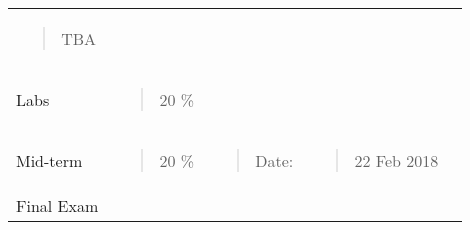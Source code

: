 \begin{longtable}[]{@{}lllll@{}}
\begin{minipage}[t]{0.19\columnwidth}
\begin{quote}
TBA
\end{quote}\strut
\end{minipage} & \begin{minipage}[t]{0.19\columnwidth}\raggedright\strut
\strut
\end{minipage}\tabularnewline
\begin{minipage}[t]{0.19\columnwidth}\raggedright\strut
Labs\strut
\end{minipage} & \begin{minipage}[t]{0.19\columnwidth}\raggedright\strut
\begin{quote}
20 \%
\end{quote}\strut
\end{minipage} & \begin{minipage}[t]{0.19\columnwidth}\raggedright\strut
\strut
\end{minipage} & \begin{minipage}[t]{0.19\columnwidth}\raggedright\strut
\strut
\end{minipage} & \begin{minipage}[t]{0.19\columnwidth}\raggedright\strut
\strut
\end{minipage}\tabularnewline
\begin{minipage}[t]{0.19\columnwidth}\raggedright\strut
Mid-term\strut
\end{minipage} & \begin{minipage}[t]{0.19\columnwidth}\raggedright\strut
\begin{quote}
20 \%
\end{quote}\strut
\end{minipage} & \begin{minipage}[t]{0.19\columnwidth}\raggedright\strut
\begin{quote}
Date:
\end{quote}\strut
\end{minipage} & \begin{minipage}[t]{0.19\columnwidth}\raggedright\strut
\begin{quote}
22 Feb 2018
\end{quote}\strut
\end{minipage} & \begin{minipage}[t]{0.19\columnwidth}\raggedright\strut
\strut
\end{minipage}\tabularnewline
\begin{minipage}[t]{0.19\columnwidth}\raggedright\strut
Final Exam\strut
\end{minipage} & \begin{minipage}[t]{0.19\columnwidth}\raggedright\strut

\end{minipage}
\end{longtable}
